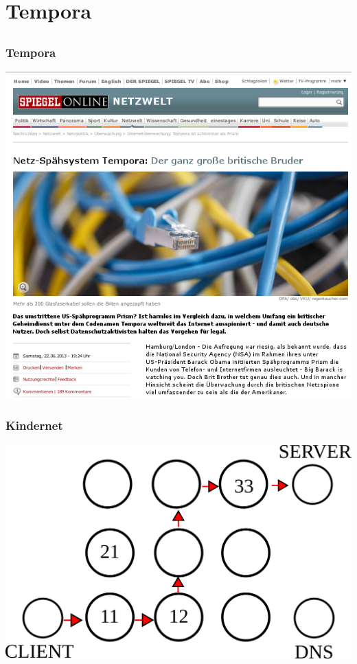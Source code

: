 \documentclass[12pt]{beamer}
\begin{document}
\section{Tempora}
\subsection{}

\begin{frame}
    \frametitle{Tempora}
    \includegraphics[height=0.7\textheight]{img/spiegel-tempora.png}
\end{frame}

\begin{frame}
    \frametitle{Kindernet}
    \includegraphics[height=0.7\textheight]{img/kindernet.png}
\end{frame}
\end{document}
